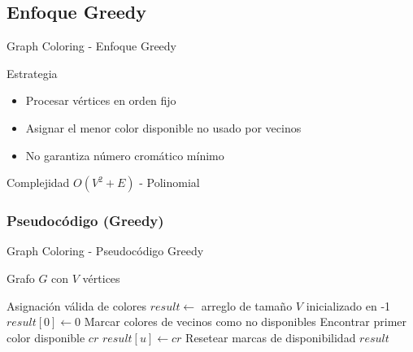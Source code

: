 \documentclass[aspectratio=169]{beamer}
\renewcommand{\algorithmicrequire}{\textbf{Entrada:}}
\renewcommand{\algorithmicensure}{\textbf{Salida:}}
\newcommand{\REQUIRE}{\item[\algorithmicrequire]}
\newcommand{\ENSURE}{\item[\algorithmicensure]}
\begin{document}
\subsection{Enfoque Greedy}
\begin{frame}{Graph Coloring - Enfoque Greedy}
\begin{block}{Estrategia}
\begin{itemize}
\item Procesar vértices en orden fijo
\item Asignar el menor color disponible no usado por vecinos
\item No garantiza número cromático mínimo
\end{itemize}
\end{block}

\begin{alertblock}{Complejidad}
$O(V^2 + E)$ - Polinomial
\end{alertblock}
\end{frame}

\subsubsection{Pseudocódigo (Greedy)}
\begin{frame}[fragile]{Graph Coloring - Pseudocódigo Greedy}
\begin{algorithmic}[1]
\REQUIRE Grafo $G$ con $V$ vértices
\ENSURE Asignación válida de colores
\State $result \leftarrow$ arreglo de tamaño $V$ inicializado en -1
\State $result[0] \leftarrow 0$
    \State Marcar colores de vecinos como no disponibles
    \State Encontrar primer color disponible $cr$
    \State $result[u] \leftarrow cr$
    \State Resetear marcas de disponibilidad
\EndFor
\Return $result$
\end{algorithmic}
\end{frame}
\end{document}
